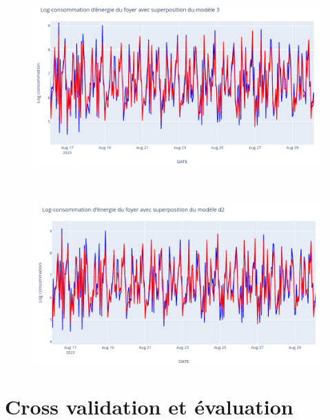 \documentclass{beamer}
\theoremstyle{definition}
\begin{document}
\begin{frame}
	\begin{figure}
		\centering
		\begin{minipage}{\linewidth}
			\centering
			\includegraphics[width=0.65\linewidth]{26.png}
		\end{minipage}
		\\
		\begin{minipage}{\linewidth}
			\centering
			\includegraphics[width=0.65\linewidth]{27.png}
		\end{minipage}
	\end{figure}
\end{frame}

\section{Cross validation et évaluation}
\end{document}
